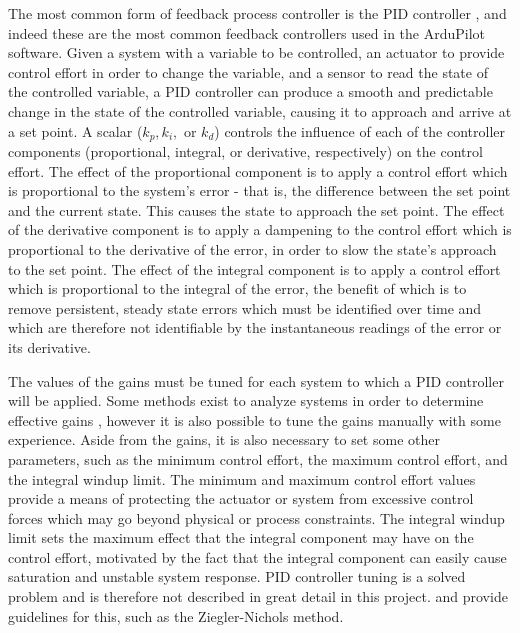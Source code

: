 \label{section:pid_controllers}
The most common form of feedback process controller is the \gls{PID} controller \cite{pid_design}, and indeed these are the most common feedback controllers used in the ArduPilot software. Given a system with a variable to be controlled, an actuator to provide control effort in order to change the variable, and a sensor to read the state of the controlled variable, a PID controller can produce a smooth and predictable change in the state of the controlled variable, causing it to approach and arrive at a set point. A scalar ($k_p, k_i,$ or $k_d$) controls the influence of each of the controller components (proportional, integral, or derivative, respectively) on the control effort. The effect of the proportional component is to apply a control effort which is proportional to the system's error - that is, the difference between the set point and the current state. This causes the state to approach the set point. The effect of the derivative component is to apply a dampening to the control effort which is proportional to the derivative of the error, in order to slow the state's approach to the set point. The effect of the integral component is to apply a control effort which is proportional to the integral of the error, the benefit of which is to remove persistent, steady state errors which must be identified over time and which are therefore not identifiable by the instantaneous readings of the error or its derivative.

The values of the gains must be tuned for each system to which a PID controller will be applied. Some methods exist to analyze systems in order to determine effective gains \cite{pid_design}, however it is also possible to tune the gains manually with some experience. Aside from the gains, it is also necessary to set some other parameters, such as the minimum control effort, the maximum control effort, and the integral windup limit. The minimum and maximum control effort values provide a means of protecting the actuator or system from excessive control forces which may go beyond physical or process constraints. The integral windup limit sets the maximum effect that the integral component may have on the control effort, motivated by the fact that the integral component can easily cause saturation and unstable system response. PID controller tuning is a solved problem and is therefore not described in great detail in this project. \cite{pid_control} and \cite{pid_design} provide guidelines for this, such as the Ziegler-Nichols method.